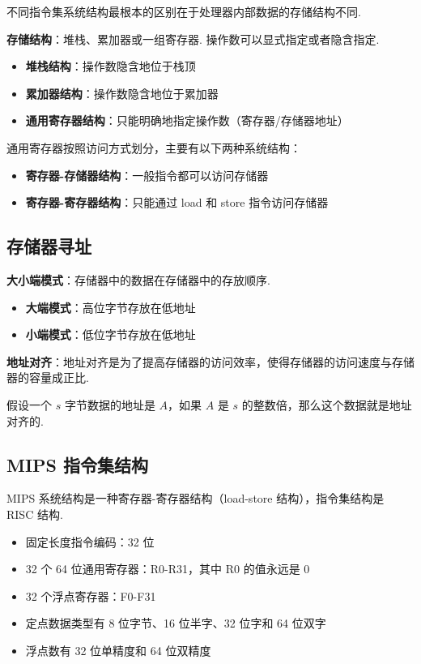 \documentclass[cn, hazy, blue, normal, 12pt]{elegantnote}
\begin{document}
不同指令集系统结构最根本的区别在于处理器内部数据的存储结构不同.

\textbf{存储结构}：堆栈、累加器或一组寄存器. 操作数可以显式指定或者隐含指定.

\begin{itemize}
    \item \textbf{堆栈结构}：操作数隐含地位于栈顶
    \item \textbf{累加器结构}：操作数隐含地位于累加器
    \item \textbf{通用寄存器结构}：只能明确地指定操作数（寄存器/存储器地址）
\end{itemize}

通用寄存器按照访问方式划分，主要有以下两种系统结构：

\begin{itemize}
    \item \textbf{寄存器-存储器结构}：一般指令都可以访问存储器
    \item \textbf{寄存器-寄存器结构}：只能通过 load 和 store 指令访问存储器
\end{itemize}

\subsection{存储器寻址}

\textbf{大小端模式}：存储器中的数据在存储器中的存放顺序.

\begin{itemize}
    \item \textbf{大端模式}：高位字节存放在低地址
    \item \textbf{小端模式}：低位字节存放在低地址
\end{itemize}

\textbf{地址对齐}：地址对齐是为了提高存储器的访问效率，使得存储器的访问速度与存储器的容量成正比.

假设一个 $s$ 字节数据的地址是 $A$，如果 $A$ 是 $s$ 的整数倍，那么这个数据就是地址对齐的.

\subsection{MIPS 指令集结构}

MIPS 系统结构是一种寄存器-寄存器结构（load-store 结构），指令集结构是 RISC 结构.

\begin{itemize}
    \item 固定长度指令编码：32 位
    \item 32 个 64 位通用寄存器：R0-R31，其中 R0 的值永远是 0
    \item 32 个浮点寄存器：F0-F31
    \item 定点数据类型有 8 位字节、16 位半字、32 位字和 64 位双字
    \item 浮点数有 32 位单精度和 64 位双精度
\end{itemize}
\end{document}

